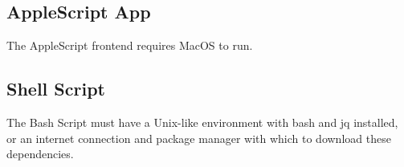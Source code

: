 \subsection{AppleScript App}
The AppleScript frontend requires MacOS to run.

\subsection{Shell Script}
The Bash Script must have a Unix-like environment with bash and jq installed, or an internet connection and package manager with which to download these dependencies.